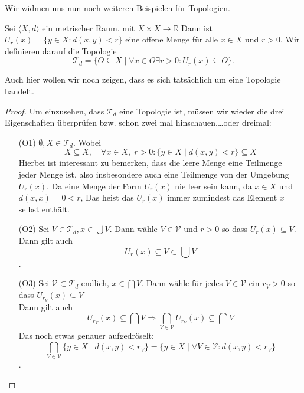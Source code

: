 Wir widmen uns nun noch weiteren Beispielen für Topologien. 

{
Sei $\langle X,d \rangle $ ein metrischer Raum. mit $X \times X \to \mathbb{R}$ Dann ist $U_{r}(x) = \{y \in X : d(x,y) < r\}$
eine offene Menge für alle $x \in X$ und $r > 0$. Wir definieren darauf die Topologie 
$$\mathcal{T}_d = \{ O \subseteq X \mid \forall x \in O \exists r > 0 : U_r(x) \subseteq O \}.$$  

Auch hier wollen wir noch zeigen, dass es sich tatsächlich um eine Topologie handelt.
\begin{proof}
Um einzusehen, dass $\mathcal{T}_d$ eine Topologie ist, müssen wir wieder 
die drei Eigenschaften überprüfen bzw. schon zwei mal hinschauen.\dots oder dreimal:
\begin{itemize}
    \item[(O1)] $\emptyset, X \in \mathcal{T}_d$.
    Wobei 
    $$
    X \subseteq X, \quad 
    \forall x \in X, \; r > 0 : \{ y \in X \mid d(x,y) < r \} \subseteq X
    $$
    Hierbei ist interessant zu bemerken, dass die leere Menge eine Teilmenge jeder Menge ist, 
    also insbesondere auch eine Teilmenge von der Umgebung $U_r(x)$.
    Da eine Menge der Form $U_r(x)$ nie leer sein kann, da $x \in X$ und $d(x,x) = 0 < r$, 
    Das heist das $U_r(x)$ immer zumindest das Element $x$ selbst enthält. 

    \item[(O2)] Sei $V \in \mathcal{T}_d, x\in \bigcup V$. Dann wähle $V \in \mathcal{V}$ 
    und $r > 0$ so dass $U_r(x) \subseteq V$. Dann gilt auch 
    $$
    U_r(x) \subseteq V \subset \bigcup V
    $$.
    \item[(O3)] Sei $\mathcal{V} \subset \mathcal{T}_d$ endlich, $x \in \bigcap V$.
    Dann wähle für jedes $V \in \mathcal{V}$ ein $r_V > 0$ so dass
    $U_{r_V}(x) \subseteq V$\\
    Dann gilt auch 
    $$
    U_{r_V}(x) \subseteq \bigcap V \Rightarrow \underset{V \in \mathcal{V}}{\bigcap} U_{r_V}(x) \subseteq \bigcap V
    $$
    Das noch etwas genauer aufgedröselt: 
    $$
    \underset{V \in \mathcal{V}}{\bigcap}\{y \in X \mid d(x,y) < r_V\} 
    = \{y \in X \mid \forall V \in \mathcal{V}: d(x,y) < r_V\}
    $$.
\end{itemize}
\end{proof}
}

